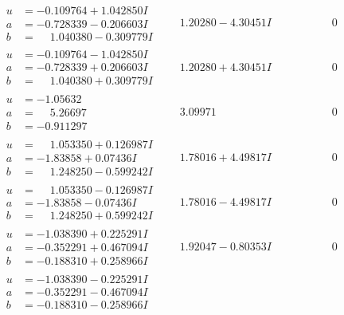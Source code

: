 \documentclass[1p]{elsarticle_modified}
\theoremstyle{definition}
\begin{document}
$$\begin{array}{c|c|c}
\begin{aligned}
u &= -0.109764 + 1.042850 I \\
a &= -0.728339 - 0.206603 I \\
b &= \phantom{-}1.040380 - 0.309779 I\end{aligned}
 & \phantom{-}1.20280 - 4.30451 I & \phantom{-0.000000 } 0 \\ \hline\begin{aligned}
u &= -0.109764 - 1.042850 I \\
a &= -0.728339 + 0.206603 I \\
b &= \phantom{-}1.040380 + 0.309779 I\end{aligned}
 & \phantom{-}1.20280 + 4.30451 I & \phantom{-0.000000 } 0 \\ \hline\begin{aligned}
u &= -1.05632\phantom{ +0.000000I} \\
a &= \phantom{-}5.26697\phantom{ +0.000000I} \\
b &= -0.911297\phantom{ +0.000000I}\end{aligned}
 & \phantom{-}3.09971\phantom{ +0.000000I} & \phantom{-0.000000 } 0 \\ \hline\begin{aligned}
u &= \phantom{-}1.053350 + 0.126987 I \\
a &= -1.83858 + 0.07436 I \\
b &= \phantom{-}1.248250 - 0.599242 I\end{aligned}
 & \phantom{-}1.78016 + 4.49817 I & \phantom{-0.000000 } 0 \\ \hline\begin{aligned}
u &= \phantom{-}1.053350 - 0.126987 I \\
a &= -1.83858 - 0.07436 I \\
b &= \phantom{-}1.248250 + 0.599242 I\end{aligned}
 & \phantom{-}1.78016 - 4.49817 I & \phantom{-0.000000 } 0 \\ \hline\begin{aligned}
u &= -1.038390 + 0.225291 I \\
a &= -0.352291 + 0.467094 I \\
b &= -0.188310 + 0.258966 I\end{aligned}
 & \phantom{-}1.92047 - 0.80353 I & \phantom{-0.000000 } 0 \\ \hline\begin{aligned}
u &= -1.038390 - 0.225291 I \\
a &= -0.352291 - 0.467094 I \\
b &= -0.188310 - 0.258966 I\end{aligned}

\end{array}$$
\end{document}
